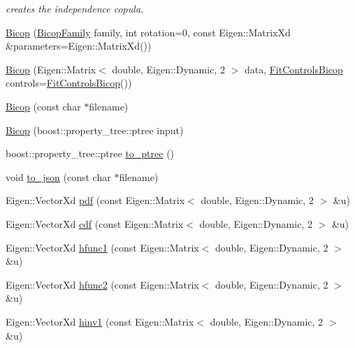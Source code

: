 \begin{DoxyCompactItemize}
\begin{DoxyCompactList}\small\item\em creates the independence copula. \end{DoxyCompactList}\item 
\hyperlink{classvinecopulib_1_1_bicop_ab27f789e001e30f2fed7f9ecefdeffb0}{Bicop} (\hyperlink{namespacevinecopulib_a42e95cc06d33896199caab0c11ad44f3}{Bicop\+Family} family, int rotation=0, const Eigen\+::\+Matrix\+Xd \&parameters=Eigen\+::\+Matrix\+Xd())
\item 
\hyperlink{classvinecopulib_1_1_bicop_afc8b465d9e02a3df1c25f7c1e7ac9240}{Bicop} (Eigen\+::\+Matrix$<$ double, Eigen\+::\+Dynamic, 2 $>$ data, \hyperlink{classvinecopulib_1_1_fit_controls_bicop}{Fit\+Controls\+Bicop} controls=\hyperlink{classvinecopulib_1_1_fit_controls_bicop}{Fit\+Controls\+Bicop}())
\item 
\hyperlink{classvinecopulib_1_1_bicop_aebe3a41e3f23817f0234fa789c443a98}{Bicop} (const char $\ast$filename)
\item 
\hyperlink{classvinecopulib_1_1_bicop_a1ecfc508b6aa5ed5b67515eb5c116986}{Bicop} (boost\+::property\+\_\+tree\+::ptree input)
\item 
boost\+::property\+\_\+tree\+::ptree \hyperlink{classvinecopulib_1_1_bicop_ab0caeb35ca5958f6927e8b0687b54893}{to\+\_\+ptree} ()
\item 
void \hyperlink{classvinecopulib_1_1_bicop_a25dedf56f3b62160642a706478f0d53c}{to\+\_\+json} (const char $\ast$filename)
\item 
Eigen\+::\+Vector\+Xd \hyperlink{classvinecopulib_1_1_bicop_a83dc7214e4bb1bfe59285ca05407d646}{pdf} (const Eigen\+::\+Matrix$<$ double, Eigen\+::\+Dynamic, 2 $>$ \&u)
\item 
Eigen\+::\+Vector\+Xd \hyperlink{classvinecopulib_1_1_bicop_a153d7e766388066eda14577c5a6332cc}{cdf} (const Eigen\+::\+Matrix$<$ double, Eigen\+::\+Dynamic, 2 $>$ \&u)
\item 
Eigen\+::\+Vector\+Xd \hyperlink{classvinecopulib_1_1_bicop_a130fda62cd61c7acdef5db75fffdd89e}{hfunc1} (const Eigen\+::\+Matrix$<$ double, Eigen\+::\+Dynamic, 2 $>$ \&u)
\item 
Eigen\+::\+Vector\+Xd \hyperlink{classvinecopulib_1_1_bicop_a4c9b50f99797ec374f5057cc54db2bd8}{hfunc2} (const Eigen\+::\+Matrix$<$ double, Eigen\+::\+Dynamic, 2 $>$ \&u)
\item 
Eigen\+::\+Vector\+Xd \hyperlink{classvinecopulib_1_1_bicop_a3cc8b161ec6efdb3b34d2efa9185bf44}{hinv1} (const Eigen\+::\+Matrix$<$ double, Eigen\+::\+Dynamic, 2 $>$ \&u)

\end{DoxyCompactItemize}
